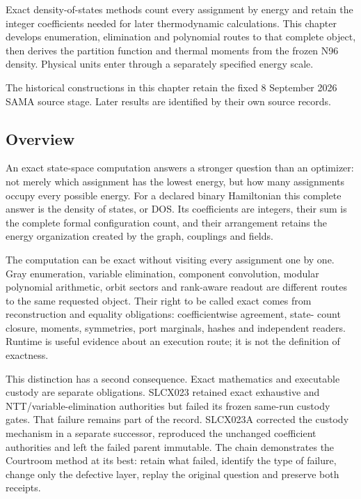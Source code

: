 \label{viii-ch03-exact-state-spaces-and-thermodynamics}

Exact density-of-states methods count every assignment by energy and retain the integer coefficients needed for later thermodynamic calculations. This chapter develops enumeration, elimination and polynomial routes to that complete object, then derives the partition function and thermal moments from the frozen N96 density. Physical units enter through a separately specified energy scale.

The historical constructions in this chapter retain the fixed 8 September 2026 SAMA source stage. Later results are identified by their own source records.

\subsection{Overview}\label{viii-ch03-overview}

An exact state-space computation answers a stronger question than an
optimizer: not merely which assignment has the lowest energy, but how
many assignments occupy every possible energy. For a declared binary
Hamiltonian this complete answer is the density of states, or DOS. Its
coefficients are integers, their sum is the complete formal
configuration count, and their arrangement retains the energy
organization created by the graph, couplings and fields.

The computation can be exact without visiting every assignment one by
one. Gray enumeration, variable elimination, component convolution,
modular polynomial arithmetic, orbit sectors and rank-aware readout are
different routes to the same requested object. Their right to be called
exact comes from reconstruction and equality obligations:
coefficientwise agreement, state- count closure, moments, symmetries,
port marginals, hashes and independent readers. Runtime is useful
evidence about an execution route; it is not the definition of
exactness.

This distinction has a second consequence. Exact mathematics and
executable custody are separate obligations. SLCX023 retained exact
exhaustive and NTT/variable-elimination authorities but failed its
frozen same-run custody gates. That failure remains part of the record.
SLCX023A corrected the custody mechanism in a separate successor,
reproduced the unchanged coefficient authorities and left the failed
parent immutable. The chain demonstrates the Courtroom method at its
best: retain what failed, identify the type of failure, change only the
defective layer, replay the original question and preserve both
receipts.

